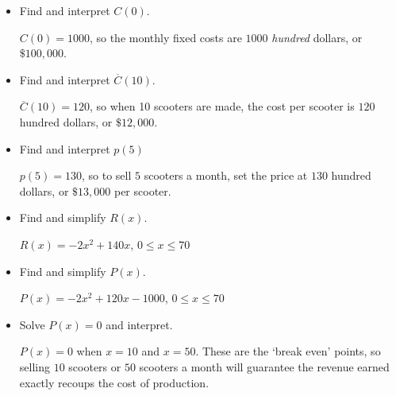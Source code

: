 \documentclass{ximera}
\begin{document}
\begin{question}
\begin{problem}
\begin{itemize}

\item  Find and interpret $C(0)$.

\begin{solution}
    $C(0) = 1000$, so the monthly fixed costs are $1000$ \textit{hundred} dollars, or $\$100,\!000$.
\end{solution}
\item  Find and interpret $\overline{C}(10)$.

\begin{solution}
    $\overline{C}(10) = 120$, so when 10 scooters are made, the cost per scooter is $120$ hundred dollars, or $\$12,\!000$.
\end{solution}
\item  Find and interpret $p(5)$

\begin{solution}
    $p(5) = 130$, so to sell $5$ scooters a month, set the price at $130$ hundred dollars, or $\$13,\!000$ per scooter.
\end{solution}
\item  Find and simplify $R(x)$.

\begin{solution}
    $R(x) = -2x^2+140x$, $0 \leq x \leq 70$
\end{solution}
\item  Find and simplify $P(x)$.

\begin{solution}
    $P(x) = -2x^2+120x-1000$, $0 \leq x \leq 70$
\end{solution}
\item  Solve $P(x) = 0$ and interpret.

\begin{solution}
    $P(x) = 0$ when $x = 10$ and $x=50$.  These are the `break even' points, so selling $10$ scooters or $50$ scooters a month will guarantee the revenue earned exactly recoups the cost of production.
\end{solution}
\end{itemize}
\end{problem} 


\end{question}
\end{document}
